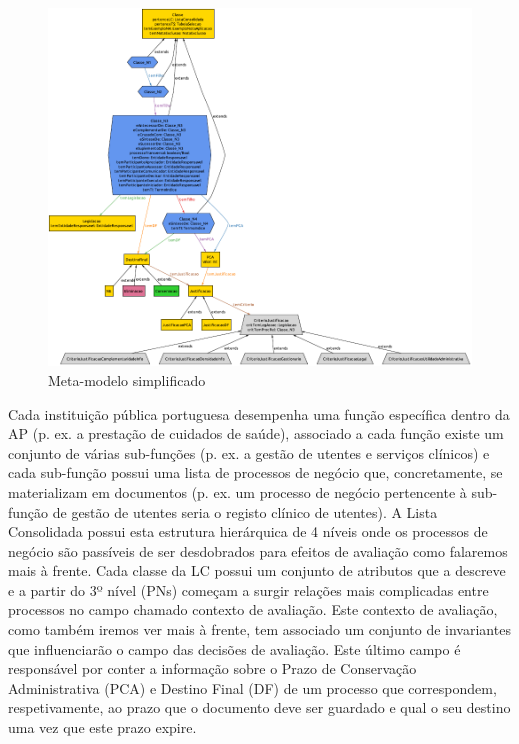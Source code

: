 \documentclass[runningheads,a4paper]{llncs}
\begin{document}
\begin{figure}[H]
\centering
\includegraphics[width=\linewidth]{metamodel.pdf}
\caption{Meta-modelo simplificado}
\label{metamodel}
\end{figure}

Cada instituição pública portuguesa desempenha uma função específica dentro da AP (p. ex. a prestação de cuidados de saúde), associado a cada função existe um conjunto de várias sub-funções (p. ex. a gestão de utentes e serviços clínicos) e cada sub-função possui uma lista de processos de negócio que, concretamente, se materializam em documentos (p. ex. um processo de negócio pertencente à sub-função de gestão de utentes seria o registo clínico de utentes). A Lista Consolidada possui esta estrutura hierárquica de 4 níveis\cite{clav-mod} onde os processos de negócio são passíveis de ser desdobrados para efeitos de avaliação como falaremos mais à frente. Cada classe da LC possui um conjunto de atributos que a descreve e a partir do 3º nível (PNs) começam a surgir relações mais complicadas entre processos no campo chamado contexto de avaliação. Este contexto de avaliação, como também iremos ver mais à frente, tem associado um conjunto de invariantes que influenciarão o campo das decisões de avaliação. Este último campo é responsável por conter a informação sobre o Prazo de Conservação Administrativa (PCA) e Destino Final (DF) de um processo que correspondem, respetivamente, ao prazo que o documento deve ser guardado e qual o seu destino uma vez que este prazo expire.
\end{document}
